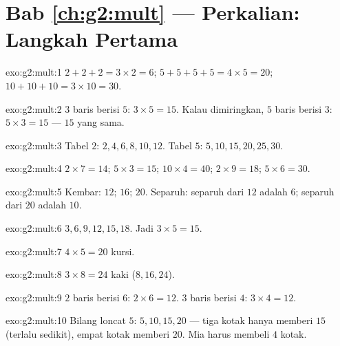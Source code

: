 \section*{Bab \ref{ch:g2:mult} --- Perkalian: Langkah Pertama}

\begin{solution}{exo:g2:mult:1}
$2 + 2 + 2 = 3 \times 2 = 6$; \quad
$5 + 5 + 5 + 5 = 4 \times 5 = 20$; \quad
$10 + 10 + 10 = 3 \times 10 = 30$.
\end{solution}

\begin{solution}{exo:g2:mult:2}
$3$ baris berisi $5$: $3 \times 5 = 15$. Kalau dimiringkan, $5$ baris
berisi $3$: $5 \times 3 = 15$ --- $15$ yang sama.
\end{solution}

\begin{solution}{exo:g2:mult:3}
Tabel $2$: $2, 4, 6, 8, 10, 12$. Tabel $5$:
$5, 10, 15, 20, 25, 30$.
\end{solution}

\begin{solution}{exo:g2:mult:4}
$2 \times 7 = 14$; \quad $5 \times 3 = 15$; \quad
$10 \times 4 = 40$; \quad $2 \times 9 = 18$; \quad
$5 \times 6 = 30$.
\end{solution}

\begin{solution}{exo:g2:mult:5}
Kembar: $12$; $16$; $20$. Separuh: separuh dari $12$ adalah $6$;
separuh dari $20$ adalah $10$.
\end{solution}

\begin{solution}{exo:g2:mult:6}
$3, 6, 9, 12, 15, 18$. Jadi $3 \times 5 = 15$.
\end{solution}

\begin{solution}{exo:g2:mult:7}
$4 \times 5 = 20$ kursi.
\end{solution}

\begin{solution}{exo:g2:mult:8}
$3 \times 8 = 24$ kaki ($8, 16, 24$).
\end{solution}

\begin{solution}{exo:g2:mult:9}
$2$ baris berisi $6$: $2 \times 6 = 12$. $3$ baris berisi $4$:
$3 \times 4 = 12$.
\end{solution}

\begin{solution}{exo:g2:mult:10}
Bilang loncat $5$: $5, 10, 15, 20$ --- tiga kotak hanya memberi $15$
(terlalu sedikit), empat kotak memberi $20$. Mia harus membeli $4$ kotak.

\end{solution}
